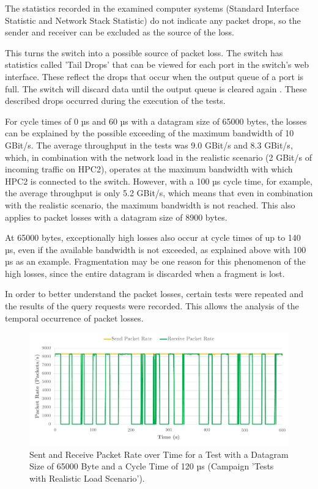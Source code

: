 The statistics recorded in the examined computer systems (Standard Interface Statistic and Network Stack Statistic) do not indicate any packet drops, so the sender and receiver can be excluded as the source of the loss.

This turns the switch into a possible source of packet loss. The switch has statistics called 'Tail Drops' that can be viewed for each port in the switch's web interface. These reflect the drops that occur when the output queue of a port is full. The switch will discard data until the output queue is cleared again \cite {reli02}. These described drops occurred during the execution of the tests.

For cycle times of 0 µs and 60 µs with a datagram size of 65000 bytes, the losses can be explained by the possible exceeding of the maximum bandwidth of 10 GBit/s. The average throughput in the tests was 9.0 GBit/s and 8.3 GBit/s, which, in combination with the network load in the realistic scenario (2 GBit/s of incoming traffic on HPC2), operates at the maximum bandwidth with which HPC2 is connected to the switch. However, with a 100 µs cycle time, for example, the average throughput is only 5.2 GBit/s, which means that even in combination with the realistic scenario, the maximum bandwidth is not reached. This also applies to packet losses with a datagram size of 8900 bytes.

At 65000 bytes, exceptionally high losses also occur at cycle times of up to 140 µs, even if the available bandwidth is not exceeded, as explained above with 100 µs as an example. Fragmentation may be one reason for this phenomenon of the high losses, since the entire datagram is discarded when a fragment is lost.

In order to better understand the packet losses, certain tests were repeated and the results of the query requests were recorded. This allows the analysis of the temporal occurrence of packet losses.

\begin{figure}[h!]
    \centering
    \includegraphics[width=1\linewidth]{figures/reliability/star/rel_d_4.pdf}
    \caption{Sent and Receive Packet Rate over Time for a Test with a Datagram Size of 65000 Byte and a Cycle Time of 120 µs (Campaign 'Tests with Realistic Load Scenario').}
    \label{fig:srpr4}
\end{figure}

